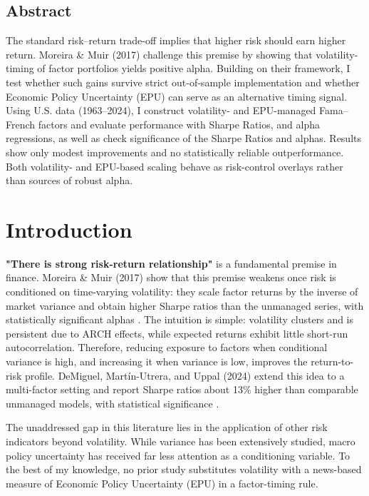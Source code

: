 \section*{Abstract}

The standard risk–return trade-off implies that higher risk should earn higher return. 
Moreira \& Muir (2017) challenge this premise by showing that volatility-timing of factor 
portfolios yields positive alpha. Building on their framework, I test whether such gains 
survive strict out-of-sample implementation and whether Economic Policy Uncertainty (EPU) 
can serve as an alternative timing signal. Using U.S. data (1963–2024), I construct 
volatility- and EPU-managed Fama–French factors and evaluate performance with Sharpe Ratios, and alpha regressions, as well as check significance of the Sharpe Ratios and alphas. Results show only modest improvements and no 
statistically reliable outperformance. Both volatility- and EPU-based scaling behave as 
risk-control overlays rather than sources of robust alpha.

\chapter{Introduction}

\textbf{"There is strong risk-return relationship"} is a fundamental premise in finance. Moreira \& Muir (2017) show that this premise weakens once risk is conditioned on time‐varying volatility: they scale factor returns by the inverse of market variance and obtain higher Sharpe ratios than the unmanaged series, with statistically significant alphas \citep{moreira2017}. The intuition is simple: volatility clusters and is persistent due to ARCH effects, while expected returns exhibit little short-run autocorrelation. Therefore, reducing exposure to factors when conditional variance is high, and increasing it when variance is low, improves the return-to-risk profile. DeMiguel, Martín-Utrera, and Uppal (2024) extend this idea to a multi-factor setting and report Sharpe ratios about 13\% higher than comparable unmanaged models, with statistical significance \citep{demiguel2024}.

The unaddressed gap in this literature lies in the application of other risk indicators beyond volatility. While variance has been extensively studied, macro policy uncertainty has received far less attention as a conditioning variable. To the best of my knowledge, no prior study substitutes volatility with a news-based measure of Economic Policy Uncertainty (EPU) in a factor-timing rule.

